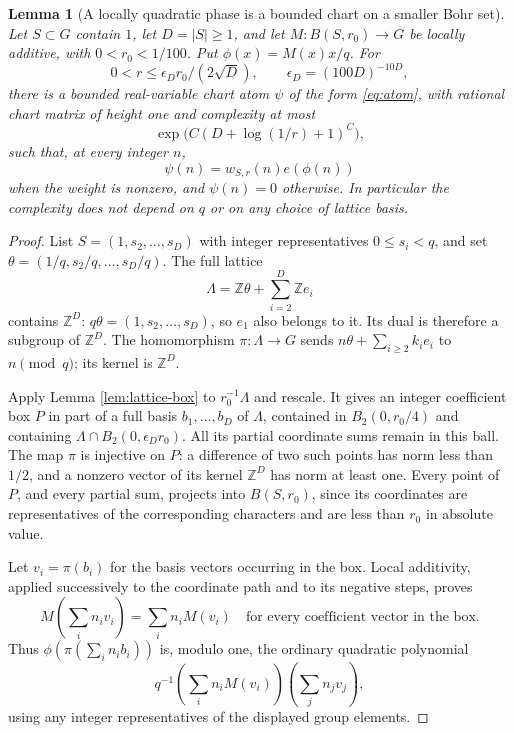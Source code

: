 \documentclass[11pt]{article}
\newtheorem{lemma}[theorem]{Lemma}
\theoremstyle{definition}
\newcommand{\Z}{\mathbb Z}
\numberwithin{equation}{section}
\begin{document}
\begin{lemma}[A locally quadratic phase is a bounded chart on a smaller Bohr set]\label{lem:local-chart}
Let $S\subset G$ contain $1$, let $D=|S|\ge1$, and let $M:B(S,r_0)\to G$ be locally additive, with $0<r_0<1/100$. Put $\phi(x)=M(x)x/q$. For
\[
 0<r\le\epsilon_D r_0/(2\sqrt D),\qquad \epsilon_D=(100D)^{-10D},
\]
there is a bounded real-variable chart atom $\psi$ of the form \eqref{eq:atom}, with rational chart matrix of height one and complexity at most
\[
 \exp\bigl(C(D+\log(1/r)+1)^C\bigr),
\]
such that, at every integer $n$,
\[
 \psi(n)=w_{S,r}(n)e(\phi(n))
\]
when the weight is nonzero, and $\psi(n)=0$ otherwise. In particular the complexity does not depend on $q$ or on any choice of lattice basis.
\end{lemma}
\begin{proof}
List $S=(1,s_2,\ldots,s_D)$ with integer representatives $0\le s_i<q$, and set $\theta=(1/q,s_2/q,\ldots,s_D/q)$. The full lattice
\[
 \Lambda=\Z\theta+\sum_{i=2}^D\Z e_i
\]
contains $\Z^D$: $q\theta=(1,s_2,\ldots,s_D)$, so $e_1$ also belongs to it. Its dual is therefore a subgroup of $\Z^D$. The homomorphism $\pi:\Lambda\to G$ sends $n\theta+\sum_{i\ge2}k_ie_i$ to $n\pmod q$; its kernel is $\Z^D$.

Apply Lemma \ref{lem:lattice-box} to $r_0^{-1}\Lambda$ and rescale. It gives an integer coefficient box $P$ in part of a full basis $b_1,\ldots,b_D$ of $\Lambda$, contained in $B_2(0,r_0/4)$ and containing $\Lambda\cap B_2(0,\epsilon_Dr_0)$. All its partial coordinate sums remain in this ball. The map $\pi$ is injective on $P$: a difference of two such points has norm less than $1/2$, and a nonzero vector of its kernel $\Z^D$ has norm at least one. Every point of $P$, and every partial sum, projects into $B(S,r_0)$, since its coordinates are representatives of the corresponding characters and are less than $r_0$ in absolute value.

Let $v_i=\pi(b_i)$ for the basis vectors occurring in the box. Local additivity, applied successively to the coordinate path and to its negative steps, proves
\[
 M\left(\sum_i n_i v_i\right)=\sum_i n_iM(v_i)
 \quad\text{for every coefficient vector in the box}.
\]
Thus $\phi(\pi(\sum_i n_ib_i))$ is, modulo one, the ordinary quadratic polynomial
\[
 q^{-1}\left(\sum_i n_i M(v_i)\right)\left(\sum_jn_jv_j\right),
\]
using any integer representatives of the displayed group elements.


\end{proof}
\end{document}
